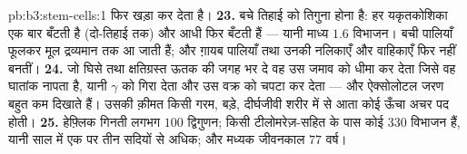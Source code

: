 \begin{solution}{pb:b3:stem-cells:1}
फिर खड़ा कर देता है।
\textbf{23.} बचे तिहाई को तिगुना होना है: हर यकृतकोशिका एक बार बँटती है
(दो-तिहाई तक) और आधी फिर बँटती हैं --- यानी माध्य $1.6$ विभाजन। बची
पालियाँ फूलकर मूल द्रव्यमान तक आ जाती हैं; और ग़ायब पालियाँ तथा उनकी
नलिकाएँ और वाहिकाएँ फिर नहीं बनतीं।
\textbf{24.} जो  घिसे तथा क्षतिग्रस्त ऊतक की जगह भर दे वह उस
जमाव को धीमा कर देता जिसे वह घातांक नापता है, यानी $\gamma$ को गिरा
देता और उस वक्र को चपटा कर देता --- और ऐक्सोलोटल जरण बहुत कम दिखाते
हैं। उसकी क़ीमत किसी गरम, बड़े, दीर्घजीवी शरीर में  से आता कोई
ऊँचा अचर पद होती।
\textbf{25.} हेफ़्लिक गिनती लगभग $100$ द्विगुणन; किसी
टीलोमरेज़-सहित  के पास कोई $330$ विभाजन हैं, यानी साल में एक
पर तीन सदियों से अधिक; और मध्यक जीवनकाल $77$ वर्ष।
\end{solution}
